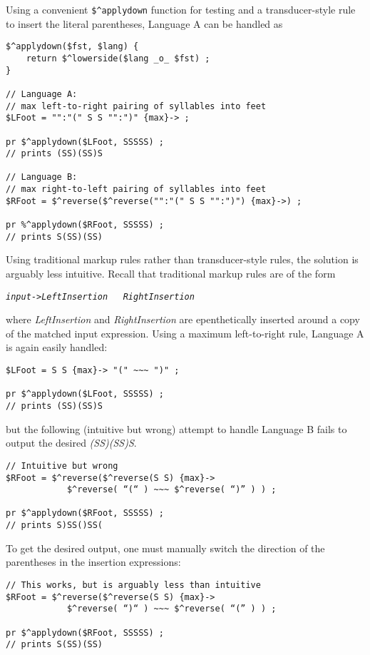 Using a convenient \verb!$^applydown! function for testing and a transducer-style
rule to insert the literal parentheses, Language A can be handled as

\begin{Verbatim}
$^applydown($fst, $lang) {
    return $^lowerside($lang _o_ $fst) ;
}

// Language A: 
// max left-to-right pairing of syllables into feet
$LFoot = "":"(" S S "":")" {max}-> ;

pr $^applydown($LFoot, SSSSS) ;
// prints (SS)(SS)S

// Language B: 
// max right-to-left pairing of syllables into feet
$RFoot = $^reverse($^reverse("":"(" S S "":")") {max}->) ;

pr %^applydown($RFoot, SSSSS) ;
// prints S(SS)(SS)
\end{Verbatim}

Using traditional markup rules rather than transducer-style rules, the solution is arguably less intuitive.  Recall
that traditional markup rules are of the form

\begin{alltt}
\emph{input} -> \emph{LeftInsertion} ~~~ \emph{RightInsertion}
\end{alltt}

\noindent
where \emph{LeftInsertion} and \emph{RightInsertion} are epenthetically inserted
around a copy of the matched input expression.  Using a maximum left-to-right
rule, Language A is again easily handled:

\begin{Verbatim}
$LFoot = S S {max}-> "(" ~~~ ")" ;

pr $^applydown($LFoot, SSSSS) ;
// prints (SS)(SS)S
\end{Verbatim}

\noindent
but the following (intuitive but wrong) attempt to handle Language B fails to
output the desired \emph{(SS)(SS)S}.

\begin{Verbatim}
// Intuitive but wrong
$RFoot = $^reverse($^reverse(S S) {max}-> 
            $^reverse( “(“ ) ~~~ $^reverse( “)” ) ) ;

pr $^applydown($RFoot, SSSSS) ;
// prints S)SS()SS(
\end{Verbatim}

\noindent
To get the desired output, one must manually switch the direction of the
parentheses in the insertion expressions:

\begin{Verbatim}
// This works, but is arguably less than intuitive
$RFoot = $^reverse($^reverse(S S) {max}-> 
            $^reverse( “)“ ) ~~~ $^reverse( “(” ) ) ;

pr $^applydown($RFoot, SSSSS) ;
// prints S(SS)(SS)
\end{Verbatim}

